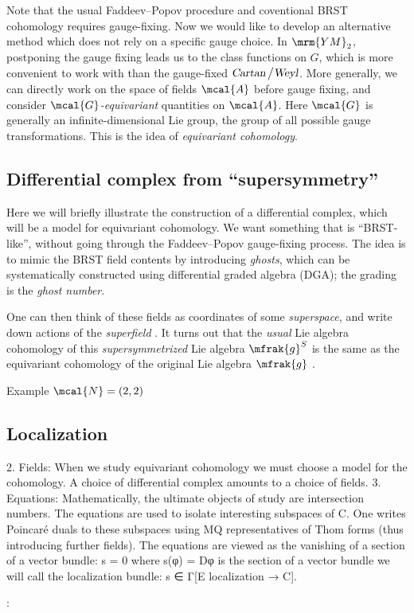 \documentclass[a4paper
	,10pt
]{article}
\newcommand{\YM}{{\ensuremath{\mrm{YM}_2}}\xspace}
\begin{document}
	Note that the usual Faddeev--Popov procedure and coventional BRST cohomology requires gauge-fixing. Now we would like to develop an alternative method which does not rely on a specific gauge choice. In \YM, postponing the gauge fixing leads us to the class functions on $G$, which is more convenient to work with than the gauge-fixed $\textsl{Cartan} \,\big/ \textsl{Weyl}$. More generally, we can directly work on the space of fields $\mcal{A}$ before gauge fixing, and consider \textit{$\mcal{G}$-equivariant} quantities on $\mcal{A}$. Here $\mcal{G}$ is generally an infinite-dimensional Lie group, the group of all possible gauge transformations. This is the idea of \textit{equivariant cohomology}. 
\subsection{Differential complex from ``supersymmetry''}
	Here we will briefly illustrate the construction of a differential complex, which will be a model for equivariant cohomology. We want something that is ``BRST-like'', without going through the Faddeev--Popov gauge-fixing process. The idea is to mimic the BRST field contents by introducing \textit{ghosts}, which can be systematically constructed using differential graded algebra (DGA); the grading is the \textit{ghost number}. 
	
	One can then think of these fields as coordinates of some \textit{superspace}, and write down actions of the \textit{superfield} \cite{Cordes:1994fc,Horne:1988yn}.  It turns out that the \textit{usual} Lie algebra cohomology of this \textit{supersymmetrized} Lie algebra $\mfrak{g}^S$ is the same as the equivariant cohomology of the original Lie algebra $\mfrak{g}$ \cite{Cordes:1994fc,Witten:1990bs}. 
	
	
	
	Example $\mcal{N} = (2,2)$
	
	
	
	
	
	
\subsection{Localization}
	
	
	
	
	
	
	
	
	2. Fields: When we study equivariant cohomology we must choose a model for the
	cohomology. A choice of differential complex amounts to a choice of fields.
	3. Equations: Mathematically, the ultimate objects of study are intersection numbers.
	The equations are used to isolate interesting subspaces of C. One writes Poincaré duals to these subspaces using MQ representatives of Thom forms (thus introducing further fields). The equations are viewed as the vanishing of a section of a vector bundle: s = 0 where s(φ) = Dφ is the section of a vector bundle we will call the
	localization bundle: s ∈ Γ[E localization → C].
	
	:
	
	
	
	
\raggedright

\printbibliography[%
	,heading = bibintoc
]
\end{document}
